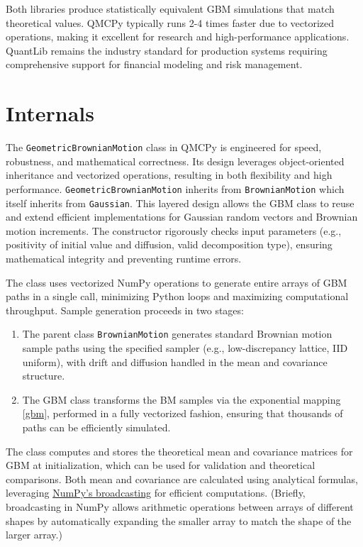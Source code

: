 \documentclass{article}
\begin{document}
Both libraries produce statistically equivalent GBM simulations that match theoretical values. QMCPy typically runs 2-4 times faster due to vectorized operations, making it excellent for research and high-performance applications. QuantLib remains the industry standard for production systems requiring comprehensive  support for financial modeling and risk management.


\section{Internals}

The \texttt{GeometricBrownianMotion} class in QMCPy is engineered for speed, robustness, and mathematical correctness. Its design leverages object-oriented inheritance and vectorized operations, resulting in both flexibility and high performance.
\texttt{GeometricBrownianMotion} inherits from \texttt{BrownianMotion} which itself inherits from \texttt{Gaussian}. This layered design allows the GBM class to reuse and extend efficient implementations for Gaussian random vectors and Brownian motion increments.
The constructor rigorously checks input parameters (e.g., positivity of initial value and diffusion, valid decomposition type), ensuring mathematical integrity and preventing runtime errors.

The class uses vectorized NumPy operations to generate entire arrays of GBM paths in a single call, minimizing Python loops and maximizing computational throughput. Sample generation proceeds in two stages:
\begin{enumerate}
\item 
The parent class \texttt{BrownianMotion} generates standard Brownian motion sample paths using the specified sampler (e.g., low-discrepancy lattice, IID uniform), with drift and diffusion handled in the mean and covariance structure.
\item  The GBM class transforms the BM samples via the exponential mapping    \eqref{gbm}, performed in a fully vectorized fashion, ensuring that thousands of paths can be efficiently simulated.
\end{enumerate}
The class computes and stores the theoretical mean and covariance matrices for GBM at initialization, which can be used for validation and theoretical comparisons. Both mean and covariance are calculated using analytical formulas, leveraging \href{https://numpy.org/devdocs/user/basics.broadcasting.html}{NumPy’s broadcasting} for efficient computations. (Briefly, broadcasting in NumPy allows arithmetic operations between arrays of different shapes by automatically expanding the smaller array to match the shape of the larger array.)
\end{document}
